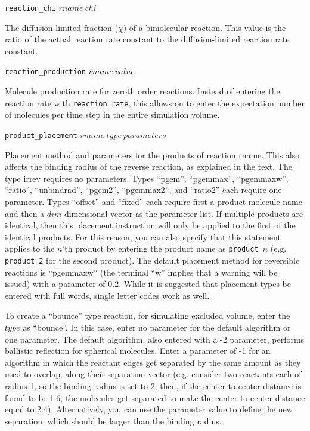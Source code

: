 \documentclass {book}
\newcommand {\ttt} {\texttt}
\begin{document}
\begin{description}
\item{\ttt{reaction\_chi} $rname\ chi$}

The diffusion-limited fraction ($\chi$) of a bimolecular reaction. This value is the ratio of the actual reaction rate constant to the diffusion-limited reaction rate constant.

\item{\ttt{reaction\_production} $rname\ value$}

Molecule production rate for zeroth order reactions. Instead of entering the reaction rate with \ttt{reaction\_rate}, this allows on to enter the expectation number of molecules per time step in the entire simulation volume.

\item{\ttt{product\_placement} $rname\ type\ parameters$}

Placement method and parameters for the products of reaction rname. This also affects the binding radius of the reverse reaction, as explained in the text. The type irrev requires no parameters. Types ``pgem'', ``pgemmax'', ``pgemmaxw'', ``ratio'', ``unbindrad'', ``pgem2'', ``pgemmax2'', and ``ratio2'' each require one parameter. Types ``offset'' and ``fixed'' each require first a product molecule name and then a $dim$-dimensional vector as the parameter list. If multiple products are identical, then this placement instruction will only be applied to the first of the identical products. For this reason, you can also specify that this statement applies to the $n$'th product by entering the product name as \ttt{product\_}$n$ (e.g. \ttt{product\_2} for the second product). The default placement method for reversible reactions is ``pgemmaxw'' (the terminal ``w'' implies that a warning will be issued) with a parameter of 0.2. While it is suggested that placement types be entered with full words, single letter codes work as well.

To create a ``bounce'' type reaction, for simulating excluded volume, enter the $type$ as ``bounce''. In this case, enter no parameter for the default algorithm or one parameter. The default algorithm, also entered with a -2 parameter, performs ballistic reflection for spherical molecules. Enter a parameter of -1 for an algorithm in which the reactant edges get separated by the same amount as they used to overlap, along their separation vector (e.g. consider two reactants each of radius 1, so the binding radius is set to 2; then, if the center-to-center distance is found to be 1.6, the molecules get separated to make the center-to-center distance equal to 2.4). Alternatively, you can use the parameter value to define the new separation, which should be larger than the binding radius.


\end{description}
\end{document}
